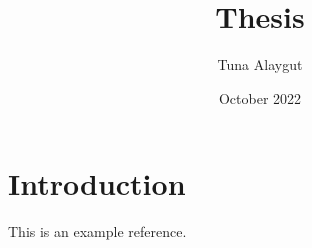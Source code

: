 \documentclass{article}
\title{Thesis}
\author{Tuna Alaygut}
\date{October 2022}
\begin{document}
\maketitle

\section{Introduction}
This \cite{what_is_reg} is an example reference.



\end{document}
